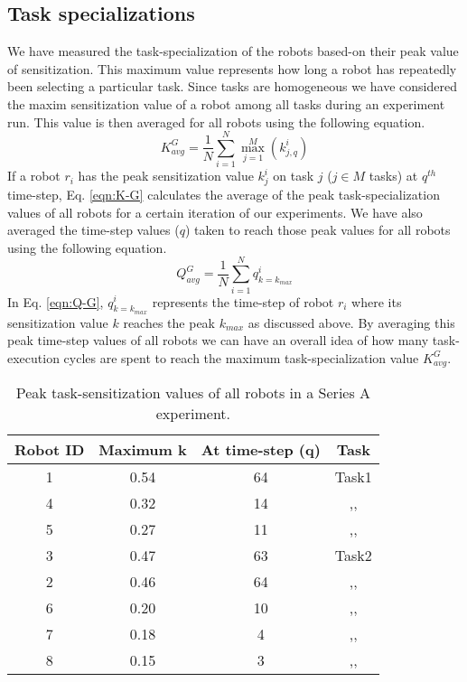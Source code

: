 \subsection*{Task specializations}
We have measured the task-specialization of the robots based-on their peak value of sensitization. This maximum value represents how long a robot has repeatedly been selecting a particular task. Since tasks are homogeneous we have considered the maxim sensitization value of a robot among all tasks during an experiment run. This value is then averaged for all robots using the following  equation. 
\begin{equation}
K^G_{avg} = \frac{1}{N}\sum_{i=1}^{N} \max_{j=1}^M\left ( k^i_{j, q} \right ) 
\label{eqn:K-G}
\end{equation}
If a robot $r_i$ has the peak sensitization value $k^i_j$ on task $j$ ($j \in M$ tasks)  at $q^{th}$ time-step, Eq. \ref{eqn:K-G} calculates the average of the peak task-specialization values of all robots for a certain iteration of our experiments. We have also averaged the time-step values ($q$) taken to reach those peak values for all robots using the following equation.
\begin{equation}
Q^G_{avg}= \frac{1}{N}\sum_{i=1}^{N} q^i_{k=k_{max}}
\label{eqn:Q-G}
\end{equation}
In Eq. \ref{eqn:Q-G}, $q^i_{k=k_{max}}$ represents the time-step of robot $r_i$  where its sensitization value $k$ reaches the peak $k_{max}$ as discussed above. By averaging this peak time-step values of all robots we can have an overall idea of how many task-execution cycles are spent to reach the maximum task-specialization value $K^G_{avg}$.
\begin{table}
\centering
\caption{Peak task-sensitization values of all robots in a Series A experiment.}
\begin{tabular}{|c|c|c|c|}
\hline \textbf{Robot ID} & \textbf{Maximum k} & \textbf{At time-step (q)} & \textbf{Task} \\ 
\hline 1 & 0.54 & 64 & Task1\\
\hline 4 & 0.32 & 14 & ,,\\
\hline 5 & 0.27 & 11 & ,,\\
\hline 3 & 0.47 & 63 & Task2\\
\hline 2 & 0.46 & 64 & ,,\\
\hline 6 & 0.20 & 10 & ,,\\
\hline 7 & 0.18 & 4 & ,,\\
\hline 8 & 0.15 & 3 & ,,\\
\hline 
\end{tabular} 
\label{table:K-G-SA}
\end{table}

